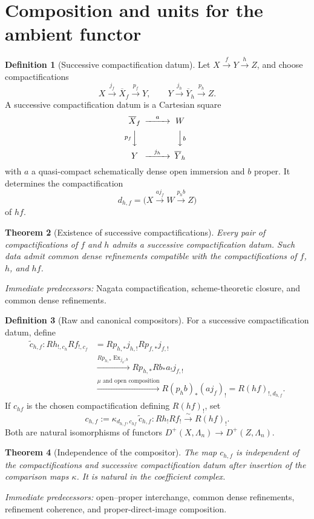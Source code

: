 \documentclass[10pt]{article}
\newtheorem{theorem}{Theorem}[section]
\theoremstyle{definition}
\newtheorem{definition}[theorem]{Definition}
\newcommand{\pred}[1]{\par\smallskip\begingroup\footnotesize\raggedright
\emph{Immediate predecessors:} #1.\par\endgroup}
\begin{document}
\section{Composition and units for the ambient functor}

\begin{definition}[Successive compactification datum]
Let \(X\xrightarrow{f}Y\xrightarrow{h}Z\), and choose compactifications
\[
 X\xrightarrow{j_f}\overline X_f\xrightarrow{p_f}Y,
 \qquad
 Y\xrightarrow{j_h}\overline Y_h\xrightarrow{p_h}Z.
\]
A successive compactification datum is a Cartesian square
\[
\begin{CD}
 \overline X_f@>{a}>>W\\
 @V{p_f}VV @VV{b}V\\
 Y@>{j_h}>>\overline Y_h
\end{CD}
\]
with \(a\) a quasi-compact schematically dense open immersion and \(b\)
proper.  It determines the compactification
\[
 d_{h,f}=\bigl(X\xrightarrow{aj_f}W\xrightarrow{p_hb}Z\bigr)
\]
of \(hf\).
\end{definition}

\begin{theorem}[Existence of successive compactifications]
Every pair of compactifications of \(f\) and \(h\) admits a successive
compactification datum.  Such data admit common dense refinements
compatible with the compactifications of \(f\), \(h\), and \(hf\).
\end{theorem}
\pred{Nagata compactification, scheme-theoretic closure, and common dense refinements}

\begin{definition}[Raw and canonical compositors]
For a successive compactification datum, define
\[
\begin{aligned}
 \widetilde c_{h,f}:Rh_{!,c_h}Rf_{!,c_f}
 &=Rp_{h,*}j_{h,!}Rp_{f,*}j_{f,!}\\
 &\xrightarrow{Rp_{h,*}\operatorname{Ex}_{j_h,b}}
 Rp_{h,*}Rb_*a_!j_{f,!}\\
 &\xrightarrow{\mu\text{ and open composition}}
 R(p_hb)_*(aj_f)_!=R(hf)_{!,d_{h,f}}.
\end{aligned}
\]
If \(c_{hf}\) is the chosen compactification defining \(R(hf)_!\), set
\[
 c_{h,f}:=
 \kappa_{d_{h,f},c_{hf}}\,\widetilde c_{h,f}:
 Rh_!Rf_!\xrightarrow{\sim}R(hf)_!.
\]
Both are natural isomorphisms of functors
\(D^+(X,\Lambda_n)\to D^+(Z,\Lambda_n)\).
\end{definition}

\begin{theorem}[Independence of the compositor]
The map \(c_{h,f}\) is independent of the compactifications and successive
compactification datum after insertion of the comparison maps \(\kappa\).
It is natural in the coefficient complex.
\end{theorem}
\pred{open--proper interchange, common dense refinements, refinement coherence, and proper-direct-image composition}
\end{document}
